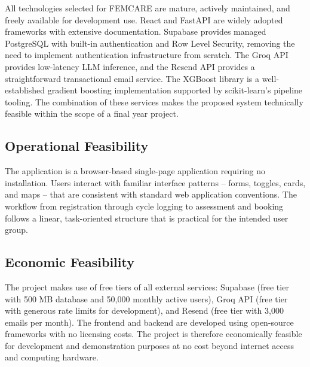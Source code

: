 All technologies selected for FEMCARE are mature, actively maintained, and freely available for development use. React and FastAPI are widely adopted frameworks with extensive documentation. Supabase provides managed PostgreSQL with built-in authentication and Row Level Security, removing the need to implement authentication infrastructure from scratch. The Groq API provides low-latency LLM inference, and the Resend API provides a straightforward transactional email service. \cite{maity2025} The XGBoost library is a well-established gradient boosting implementation supported by scikit-learn's pipeline tooling. \cite{ahmed2023}\cite{zad2024} The combination of these services makes the proposed system technically feasible within the scope of a final year project.

\subsection{Operational Feasibility}

The application is a browser-based single-page application requiring no installation. Users interact with familiar interface patterns -- forms, toggles, cards, and maps -- that are consistent with standard web application conventions. The workflow from registration through cycle logging to assessment and booking follows a linear, task-oriented structure that is practical for the intended user group.

\subsection{Economic Feasibility}

The project makes use of free tiers of all external services: Supabase (free tier with 500 MB database and 50,000 monthly active users), Groq API (free tier with generous rate limits for development), and Resend (free tier with 3,000 emails per month). The frontend and backend are developed using open-source frameworks with no licensing costs. The project is therefore economically feasible for development and demonstration purposes at no cost beyond internet access and computing hardware.


